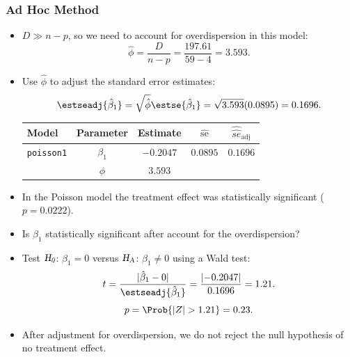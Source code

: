 \documentclass[oneside]{book}\usepackage[]{graphicx}\usepackage[svgnames]{xcolor}
\newcommand{\HN}{\textsl{H}_{\textsl{0}}}%
\newcommand{\HA}{\textsl{H}_{\textsl{A}}}%
\DeclarePairedDelimiter\abs{\lvert}{\rvert}
\begin{document}
\subsubsection*{Ad Hoc Method}
\begin{itemize}
    \item $ D\gg n-p $, so we need to account for overdispersion in this model:
          \[ \hat{\phi}=\frac{D}{n-p}=\frac{197.61}{59-4}=3.593. \]
    \item Use $ \hat{\phi} $ to adjust the standard error estimates:
          \[ \estseadj{\hat{\beta}_1}=\sqrt{\hat{\phi}}\estse{\hat{\beta}_1}=\sqrt{3.593}(0.0895)=0.1696. \]
          \begin{table}[H]
              \centering
              \begin{tabular}{lcccc}
                  Model             & Parameter   & Estimate    & $ \hat{\text{se}} $ & $ \widehat{\hat{se}}_{\text{adj}} $ \\
                  \midrule
                  \texttt{poisson1} & $ \beta_1 $ & $ -0.2047 $ & $ 0.0895 $          & $0.1696$                            \\
                                    & $ \phi $    & $3.593$                                                                 \\
                  \bottomrule
              \end{tabular}
          \end{table}
    \item In the Poisson model the treatment effect was statistically significant ($ p=0.0222 $).
    \item Is $ \beta_1 $ statistically significant after account for the overdispersion?
    \item Test $ \HN $: $ \beta_1=0 $ versus $ \HA $: $ \beta_1\ne 0 $ using a Wald test:
          \[ t=\frac{\abs{\hat{\beta}_1-0}}{\estseadj{\hat{\beta}_1}}=\frac{\abs{-0.2047}}{0.1696}=1.21. \]
          \[ p=\Prob{\abs{Z}>1.21}=0.23. \]
    \item After adjustment for overdispersion, we do not reject the null hypothesis of no
          treatment effect.
\end{itemize}
\end{document}
